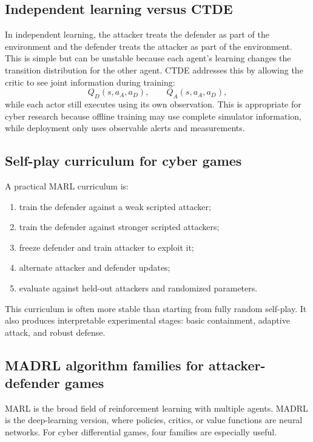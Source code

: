 \documentclass[11pt,a4paper]{article}
\begin{document}
\subsection{Independent learning versus CTDE}
In independent learning, the attacker treats the defender as part of the environment and the defender treats the attacker as part of the environment. This is simple but can be unstable because each agent's learning changes the transition distribution for the other agent. CTDE addresses this by allowing the critic to see joint information during training:
\begin{equation}
Q_D(s,a_A,a_D),\qquad Q_A(s,a_A,a_D),
\end{equation}
while each actor still executes using its own observation. This is appropriate for cyber research because offline training may use complete simulator information, while deployment only uses observable alerts and measurements.

\subsection{Self-play curriculum for cyber games}
A practical MARL curriculum is:
\begin{enumerate}
\item train the defender against a weak scripted attacker;
\item train the defender against stronger scripted attackers;
\item freeze defender and train attacker to exploit it;
\item alternate attacker and defender updates;
\item evaluate against held-out attackers and randomized parameters.
\end{enumerate}
This curriculum is often more stable than starting from fully random self-play. It also produces interpretable experimental stages: basic containment, adaptive attack, and robust defense.


\subsection{MADRL algorithm families for attacker-defender games}
MARL is the broad field of reinforcement learning with multiple agents. MADRL is the deep-learning version, where policies, critics, or value functions are neural networks. For cyber differential games, four families are especially useful.
\end{document}
